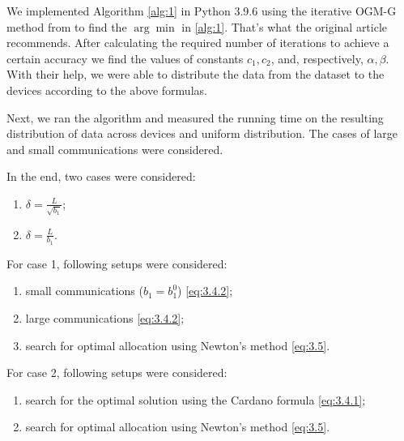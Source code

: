 \documentclass{article}
\begin{document}

 We implemented Algorithm \ref{alg:1} in Python 3.9.6 using the iterative OGM-G method from \cite{kim2021optimizing} to find the $\arg\min$ in \ref{alg:1}. That's what the original article \cite{kovalev2022optimal} recommends. After calculating the required number of iterations to achieve a certain accuracy we find the values of constants $c_1, c_2$, and, respectively, $\alpha, \beta$. With their help, we were able to distribute the data from the dataset to the devices according to the above formulas. 

Next, we ran the algorithm and measured the running time on the resulting distribution of data across devices and uniform distribution. The cases of large and small communications were considered. 

In the end, two cases were considered: 
\begin{enumerate}
    \item $\delta = \frac{L}{\sqrt{b_1}}$;
    \item $\delta = \frac{L}{b_1}$.
\end{enumerate}

For case 1, following setups were considered:
\begin{enumerate}
    \item small communications ($b_1 = b_1^0$) \eqref{eq:3.4.2};
    \item large communications \eqref{eq:3.4.2};
    \item search for optimal allocation using Newton's method \eqref{eq:3.5}.
\end{enumerate}

For case 2, following setups were considered:
\begin{enumerate}
    \item search for the optimal solution using the Cardano formula \eqref{eq:3.4.1};
    \item search for optimal allocation using Newton's method \eqref{eq:3.5}.
\end{enumerate}
\end{document}
